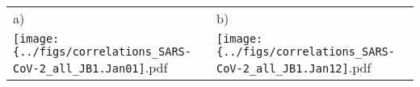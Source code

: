 \documentclass[]{standalone}
\begin{document}
\begin{tabular}{ll}
a) & b) \\[-1.275em]
\hspace{1ex} \texttt{[image: \{../figs/correlations\_SARS-CoV-2\_all\_JB1.Jan01]}.pdf}
&
\hspace{1ex} \texttt{[image: \{../figs/correlations\_SARS-CoV-2\_all\_JB1.Jan12]}.pdf}
\end{tabular}
\end{document}
